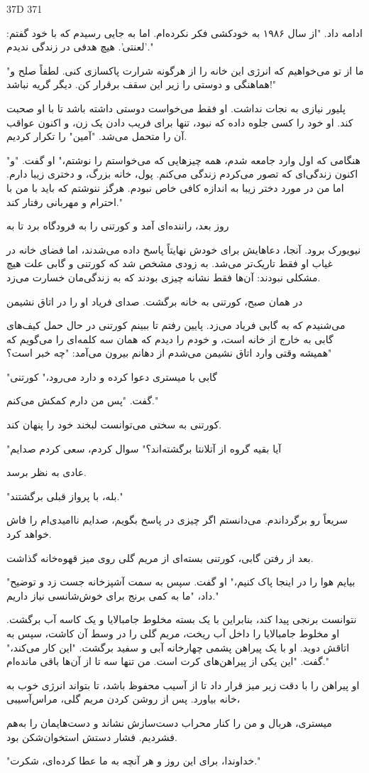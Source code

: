 \LTR
37D 371

\RTL
ادامه داد. "از سال ۱۹۸۶ به خودکشی فکر نکرده‌ام. اما به جایی رسیدم که با خود گفتم: 'لعنتی'. هیچ هدفی در زندگی ندیدم."

\LTR
"ما از تو می‌خواهیم که انرژی این خانه را از هرگونه شرارت پاکسازی کنی. لطفاً
صلح و هماهنگی و دوستی را زیر این سقف برقرار کن. دیگر گریه نباشد!"

\RTL
پلیور نیازی به نجات نداشت. او فقط می‌خواست دوستی داشته باشد تا با او صحبت کند. او
خود را کسی جلوه داده که نبود، تنها برای فریب دادن یک زن، و اکنون عواقب آن را متحمل می‌شد.
"آمین" را تکرار کردیم.

\LTR
"هنگامی که اول وارد جامعه شدم، همه چیزهایی که می‌خواستم را نوشتم،"
\RTL
او گفت. "و اکنون زندگی‌ای که تصور می‌کردم زندگی می‌کنم. پول، خانه بزرگ،
و دختری زیبا دارم. اما من در مورد دختر زیبا به اندازه کافی خاص نبودم.
هرگز ننوشتم که باید با من با احترام و مهربانی رفتار کند."

\LTR
روز بعد، راننده‌ای آمد و کورتنی را به فرودگاه برد تا به

\RTL
نیویورک برود. آنجا، دعاهایش برای خودش نهایتاً پاسخ داده می‌شدند،
اما فضای خانه در غیاب او فقط تاریک‌تر می‌شد.
به زودی مشخص شد که کورتنی و گابی علت هیچ مشکلی نبودند:
آن‌ها فقط نشانه چیزی بودند که به زندگی‌مان خسارت می‌زد.

\LTR
در همان صبح، کورتنی به خانه برگشت. صدای فریاد او را در اتاق نشیمن

\RTL
می‌شنیدم که به گابی فریاد می‌زد.
پایین رفتم تا ببینم کورتنی در حال حمل کیف‌های گابی به خارج از خانه است،
و خودم را دیدم که همان سه کلمه‌ای را می‌گویم که همیشه وقتی وارد اتاق نشیمن
می‌شدم از دهانم بیرون می‌آمد: "چه خبر است؟"

\LTR
"گابی با میستری دعوا کرده و دارد می‌رود،" کورتنی

\RTL
گفت. "پس من دارم کمکش می‌کنم."

\LTR
کورتنی به سختی می‌توانست لبخند خود را پنهان کند.

\RTL
"آیا بقیه گروه از آتلانتا برگشته‌اند؟" سوال کردم، سعی کردم صدایم

\LTR
عادی به نظر برسد.

"بله، با پرواز قبلی برگشتند."

\RTL
سریعاً رو برگرداندم. می‌دانستم اگر چیزی در پاسخ بگویم، صدایم
ناامیدی‌ام را فاش خواهد کرد.

\LTR
بعد از رفتن گابی، کورتنی بسته‌ای از مریم گلی روی میز قهوه‌خانه گذاشت.

\RTL
"بیایم هوا را در اینجا پاک کنیم،" او گفت. سپس به سمت آشپزخانه جست زد
و توضیح داد، "ما به کمی برنج برای خوش‌شانسی نیاز داریم."

\LTR
نتوانست برنجی پیدا کند، بنابراین با یک بسته مخلوط جامبالایا و یک کاسه آب برگشت.
او مخلوط جامبالایا را داخل آب ریخت، مریم گلی را در وسط آن کاشت، سپس به اتاقش دوید.
او با یک پیراهن پشمی چهارخانه آبی و سفید برگشت.
"این کار می‌کند،" گفت. "این یکی از پیراهن‌های کرت است. من تنها سه تا از آن‌ها باقی مانده‌ام."

\RTL
او پیراهن را با دقت زیر میز قرار داد تا از آسیب محفوظ باشد،
تا بتواند انرژی خوب به خانه بیاورد. پس از روشن کردن مریم گلی، مراس‌آسیبی،

\LTR
میستری، هربال و من را کنار محراب دست‌سازش نشاند و دست‌هایمان را به‌هم فشردیم. فشار دستش استخوان‌شکن بود.

\RTL
"خداوندا، برای این روز و هر آنچه به ما عطا کرده‌ای، شکرت."